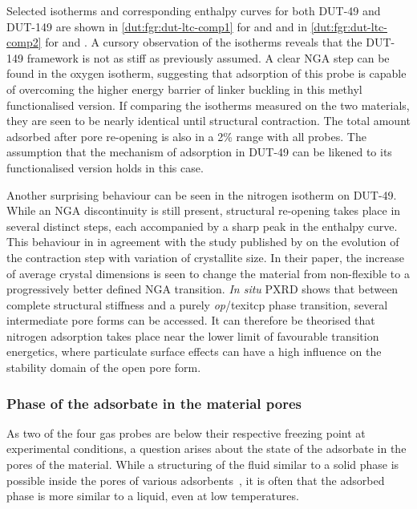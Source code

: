 Selected isotherms and corresponding enthalpy curves for both 
DUT-49 and DUT-149 are shown in \autoref{dut:fgr:dut-ltc-comp1}
for  and  and in \autoref{dut:fgr:dut-ltc-comp2}
for  and . A cursory observation of the isotherms
reveals that the DUT-149 framework is not as stiff as 
previously assumed. A clear NGA step can be found in the 
oxygen isotherm, suggesting that adsorption of this probe is capable 
of overcoming the higher energy barrier of linker buckling in 
this methyl functionalised version.
If comparing the isotherms measured on the two materials, they
are seen to be nearly identical until structural contraction.
The total amount adsorbed after pore re-opening is also in a 
2\% range with all probes. The assumption that the mechanism 
of adsorption in DUT-49 can be likened to its functionalised
version holds in this case.

Another surprising behaviour
can be seen in the nitrogen isotherm on DUT-49. While an NGA
discontinuity is still present, structural re-opening takes
place in several distinct steps, each accompanied by a sharp 
peak in the enthalpy curve. This behaviour in in
agreement with the study published by 
 \citet{krauseEffectCrystalliteSize2018}
on the evolution of the contraction step with variation of 
crystallite size. In their paper, the increase of average 
crystal dimensions is seen to change the material from non-flexible 
to a progressively better defined NGA transition. \textit{In situ} 
PXRD shows that between complete structural stiffness and a 
purely \textit{op}/texit{cp} phase transition, several intermediate 
pore forms can be accessed. It can therefore be theorised that 
nitrogen adsorption takes place near the lower limit of 
favourable transition energetics, where particulate surface 
effects can have a high influence on the stability domain of
the open pore form.

\subsubsection{Phase of the adsorbate in the material pores}

As two of the four gas probes are below their respective freezing point
at experimental conditions, a question arises about the state of
the adsorbate in the pores of the material. While a structuring of
the fluid similar to a solid phase is possible inside the 
pores of various adsorbents~\cite{llewellynAdsorptionMFItypeZeolites1993a},
it is often that the adsorbed phase is more similar to a liquid,
even at low temperatures.

